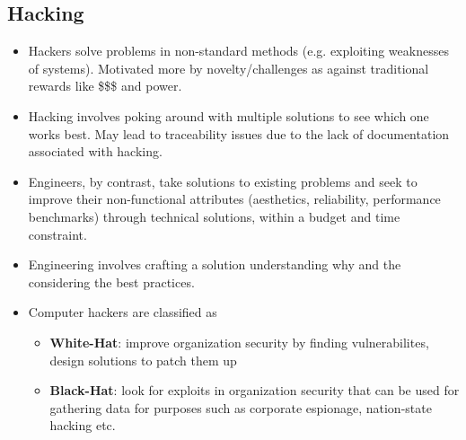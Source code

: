 \documentclass{article}
\begin{document}
\subsection{Hacking}
\begin{itemize}
    \item Hackers solve problems in non-standard methods (e.g. exploiting weaknesses of systems). Motivated more by novelty/challenges as against traditional rewards like \$\$\$ and power.
    
    \item Hacking involves poking around with multiple solutions to see which one works best. May lead to traceability issues due to the lack of documentation associated with hacking.
    
    \item Engineers, by contrast, take solutions to existing problems and seek to improve their non-functional attributes (aesthetics, reliability, performance benchmarks) through technical solutions, within a budget and time constraint. 
    
    \item Engineering involves crafting a solution understanding why and the considering the best practices.
    
    \item Computer hackers are classified as 
    \begin{itemize}
        \item \textbf{White-Hat}: improve organization security by finding vulnerabilites, design solutions to patch them up
        
        \item \textbf{Black-Hat}: look for exploits in organization security that can be used for gathering data for purposes such as corporate espionage, nation-state hacking etc.
    \end{itemize}
\end{itemize}
\end{document}
